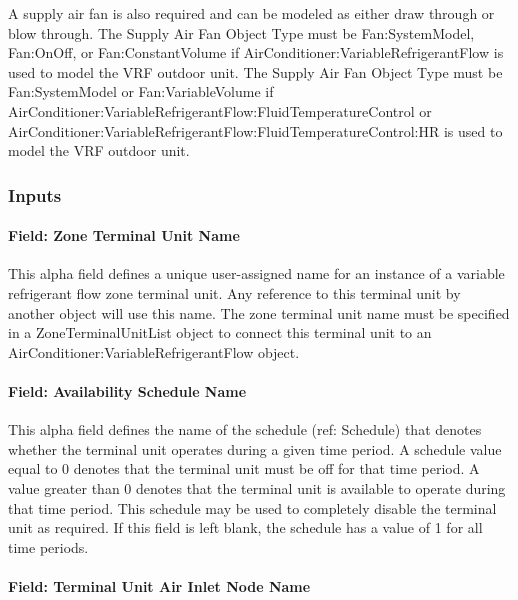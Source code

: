 A supply air fan is also required and can be modeled as either draw through or blow through. The Supply Air Fan Object Type must be Fan:SystemModel, Fan:OnOff, or Fan:ConstantVolume if AirConditioner:VariableRefrigerantFlow is used to model the VRF outdoor unit. The Supply Air Fan Object Type must be Fan:SystemModel or Fan:VariableVolume if AirConditioner:VariableRefrigerantFlow:\-FluidTemperatureControl or AirConditioner:VariableRefrigerantFlow:\-FluidTemperatureControl:HR is used to model the VRF outdoor unit.

\subsubsection{Inputs}\label{inputs-14-018}

\paragraph{Field: Zone Terminal Unit Name}\label{field-zone-terminal-unit-name}

This alpha field defines a unique user-assigned name for an instance of a variable refrigerant flow zone terminal unit. Any reference to this terminal unit by another object will use this name. The zone terminal unit name must be specified in a ZoneTerminalUnitList object to connect this terminal unit to an AirConditioner:VariableRefrigerantFlow object.

\paragraph{Field: Availability Schedule Name}\label{field-availability-schedule-name-13-001}

This alpha field defines the name of the schedule (ref: Schedule) that denotes whether the terminal unit operates during a given time period. A schedule value equal to 0 denotes that the terminal unit must be off for that time period. A value greater than 0 denotes that the terminal unit is available to operate during that time period. This schedule may be used to completely disable the terminal unit as required. If this field is left blank, the schedule has a value of 1 for all time periods.

\paragraph{Field: Terminal Unit Air Inlet Node Name}\label{field-terminal-unit-air-inlet-node-name}

